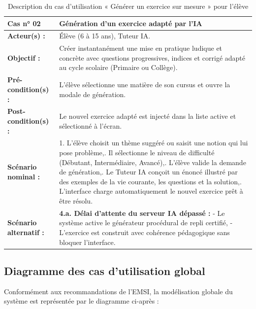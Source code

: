 \documentclass[12pt,a4paper]{report}
\begin{document}
\begin{table}[H]
\centering
\caption{Description du cas d'utilisation « Générer un exercice sur mesure » pour l'élève}
\label{tab:cu_gen}
\small
\begin{tabular}{|l|p{11cm}|}
\hline
\rowcolor{LightGray}
\textbf{Cas n° 02} & \textbf{Génération d'un exercice adapté par l'IA} \\ \hline
\textbf{Acteur(s) :} & Élève (6 à 15 ans), Tuteur IA. \\ \hline
\textbf{Objectif :} & Créer instantanément une mise en pratique ludique et concrète avec questions progressives, indices et corrigé adapté au cycle scolaire (Primaire ou Collège). \\ \hline
\textbf{Pré-condition(s) :} & L'élève sélectionne une matière de son cursus et ouvre la modale de génération. \\ \hline
\textbf{Post-condition(s) :} & Le nouvel exercice adapté est injecté dans la liste active et sélectionné à l'écran. \\ \hline
\textbf{Scénario nominal :} & 
1. L'élève choisit un thème suggéré ou saisit une notion qui lui pose problème,\newline
2. Il sélectionne le niveau de difficulté (Débutant, Intermédiaire, Avancé),\newline
3. L'élève valide la demande de génération,\newline
4. Le Tuteur IA conçoit un énoncé illustré par des exemples de la vie courante, les questions et la solution,\newline
5. L'interface charge automatiquement le nouvel exercice prêt à être résolu. \\ \hline
\textbf{Scénario alternatif :} & 
\textbf{4.a. Délai d'attente du serveur IA dépassé :}\newline
- Le système active le générateur procédural de repli certifié,\newline
- L'exercice est construit avec cohérence pédagogique sans bloquer l'interface. \\ \hline
\end{tabular}
\end{table}

\subsection{Diagramme des cas d'utilisation global}
Conformément aux recommandations de l'EMSI, la modélisation globale du système est représentée par le diagramme ci-après :
\end{document}
